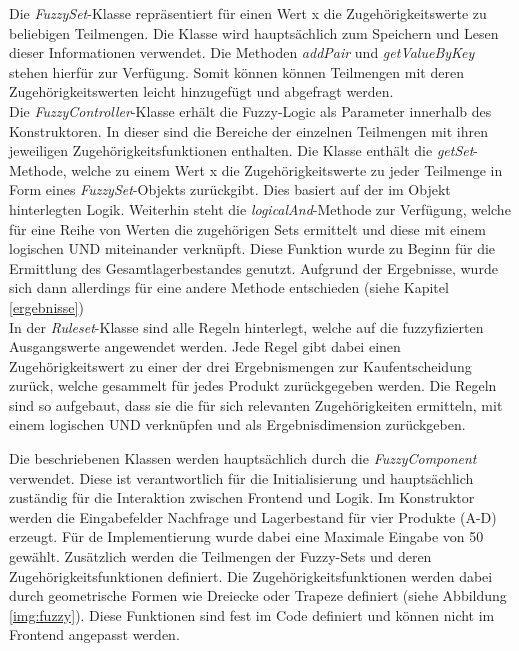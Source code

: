 \documentclass[]{scrartcl}
\begin{document}
Die \textit{FuzzySet}-Klasse repräsentiert für einen Wert x die Zugehörigkeitswerte zu beliebigen Teilmengen. Die Klasse wird hauptsächlich zum Speichern und Lesen dieser Informationen verwendet. Die Methoden \textit{addPair} und \textit{getValueByKey} stehen hierfür zur Verfügung. Somit können können Teilmengen mit deren Zugehörigkeitswerten leicht  hinzugefügt und abgefragt werden.
\\

Die \textit{FuzzyController}-Klasse erhält die Fuzzy-Logic als Parameter innerhalb des Konstruktoren. In dieser sind die Bereiche der einzelnen Teilmengen mit ihren jeweiligen Zugehörigkeitsfunktionen enthalten. Die Klasse enthält die \textit{getSet}-Methode, welche zu einem Wert x die Zugehörigkeitswerte zu jeder Teilmenge in Form eines \textit{FuzzySet}-Objekts zurückgibt. Dies basiert auf der im Objekt hinterlegten Logik. Weiterhin steht die \textit{logicalAnd}-Methode zur Verfügung, welche für eine Reihe von Werten die zugehörigen Sets ermittelt und diese mit einem logischen UND miteinander verknüpft. Diese Funktion wurde zu Beginn für die Ermittlung des Gesamtlagerbestandes genutzt. Aufgrund der Ergebnisse, wurde sich dann allerdings für eine andere Methode entschieden (siehe Kapitel \ref{ergebnisse})
\\

In der \textit{Ruleset}-Klasse sind alle Regeln hinterlegt, welche auf die fuzzyfizierten Ausgangswerte angewendet werden. Jede Regel gibt dabei einen Zugehörigkeitswert zu einer der drei Ergebnismengen zur Kaufentscheidung zurück, welche gesammelt für jedes Produkt zurückgegeben werden. Die Regeln sind so aufgebaut, dass sie die für sich relevanten Zugehörigkeiten ermitteln, mit einem logischen UND verknüpfen und als Ergebnisdimension zurückgeben.

Die beschriebenen Klassen werden hauptsächlich durch die \textit{FuzzyComponent} verwendet. Diese ist verantwortlich für die Initialisierung und hauptsächlich zuständig für die Interaktion zwischen Frontend und Logik. Im Konstruktor werden die Eingabefelder Nachfrage und Lagerbestand für vier Produkte (A-D) erzeugt. Für de Implementierung wurde dabei eine Maximale Eingabe von 50 gewählt. Zusätzlich werden die Teilmengen der Fuzzy-Sets und deren Zugehörigkeitsfunktionen definiert. Die Zugehörigkeitsfunktionen werden dabei durch geometrische Formen wie Dreiecke oder Trapeze definiert (siehe Abbildung \ref{img:fuzzy}). Diese Funktionen sind fest im Code definiert und können nicht im Frontend angepasst werden.
\\
\end{document}
